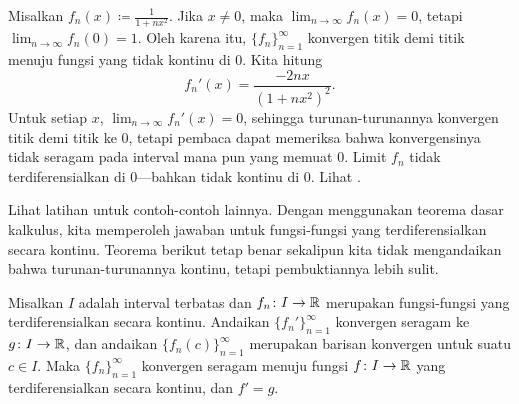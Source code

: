 \begin{example} \label{exercise:badconvergenceder}
Misalkan $f_n(x) \coloneqq \frac{1}{1+nx^2}$.
Jika $x \neq 0$, maka $\lim_{n \to \infty} f_n(x) = 0$,
tetapi $\lim_{n \to \infty} f_n(0) = 1$.
Oleh karena itu, $\{ f_n \}_{n=1}^\infty$ konvergen titik demi titik menuju fungsi yang tidak kontinu
di $0$.
Kita hitung
\begin{equation*}
f_n'(x) %
= \frac{-2 n x}{(1+ n x^2)^2} .
\end{equation*}
Untuk setiap $x$, $\lim_{n\to\infty} f_n'(x) = 0$, sehingga turunan-turunannya
konvergen titik demi titik ke 0,
tetapi pembaca dapat memeriksa bahwa konvergensinya tidak seragam pada interval mana pun
yang memuat $0$.
Limit $f_n$ tidak terdiferensialkan di $0$---bahkan tidak
kontinu di $0$.  Lihat .
\begin{myfigureht}
\caption{Grafik $\frac{1}{1+nx^2}$ dan turunannya
untuk $n=1,2,\ldots,10$, dengan $n$ yang lebih besar digambar dalam warna abu-abu yang lebih muda.%
\label{fig:convder1over1pnxsq}}
\end{myfigureht}
\end{example}

Lihat latihan untuk contoh-contoh lainnya.  Dengan menggunakan
teorema dasar kalkulus, kita memperoleh jawaban untuk fungsi-fungsi yang
terdiferensialkan secara kontinu.  Teorema berikut tetap benar sekalipun
kita tidak mengandaikan bahwa turunan-turunannya kontinu, tetapi pembuktiannya lebih
sulit.

\begin{thm} \label{thm:dersconverge}
Misalkan $I$ adalah interval terbatas dan
$f_n \colon I \to {\mathbb{R}}$ merupakan fungsi-fungsi yang terdiferensialkan secara kontinu.
Andaikan $\{ f_n' \}_{n=1}^\infty$ konvergen seragam ke $g \colon I \to {\mathbb{R}}$,
dan andaikan $\bigl\{ f_n(c) \bigr\}_{n=1}^\infty$ merupakan
barisan konvergen untuk suatu $c \in I$.  Maka $\{ f_n \}_{n=1}^\infty$ konvergen seragam menuju
fungsi $f \colon I \to {\mathbb{R}}$ yang terdiferensialkan secara kontinu, dan $f' = g$.
\end{thm}

